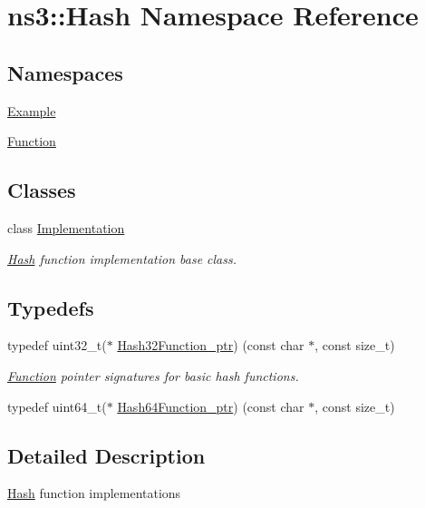 \hypertarget{namespacens3_1_1Hash}{}\section{ns3\+:\+:Hash Namespace Reference}
\label{namespacens3_1_1Hash}
\subsection*{Namespaces}
\begin{DoxyCompactItemize}
\item 
 \hyperlink{namespacens3_1_1Hash_1_1Example}{Example}
\item 
 \hyperlink{namespacens3_1_1Hash_1_1Function}{Function}
\end{DoxyCompactItemize}
\subsection*{Classes}
\begin{DoxyCompactItemize}
\item 
class \hyperlink{classns3_1_1Hash_1_1Implementation}{Implementation}
\begin{DoxyCompactList}\small\item\em \hyperlink{namespacens3_1_1Hash}{Hash} function implementation base class. \end{DoxyCompactList}\end{DoxyCompactItemize}
\subsection*{Typedefs}
{\bf }\par
\begin{DoxyCompactItemize}
\item 
typedef uint32\+\_\+t($\ast$ \hyperlink{group__hash_gaf05ee221eddbade063bfefbf34ed485a}{Hash32\+Function\+\_\+ptr}) (const char $\ast$, const size\+\_\+t)
\begin{DoxyCompactList}\small\item\em \hyperlink{namespacens3_1_1Hash_1_1Function}{Function} pointer signatures for basic hash functions. \end{DoxyCompactList}\item 
typedef uint64\+\_\+t($\ast$ \hyperlink{group__hash_gab363931a84d780a98d09dd85db36a666}{Hash64\+Function\+\_\+ptr}) (const char $\ast$, const size\+\_\+t)
\end{DoxyCompactItemize}



\subsection{Detailed Description}
\hyperlink{namespacens3_1_1Hash}{Hash} function implementations 